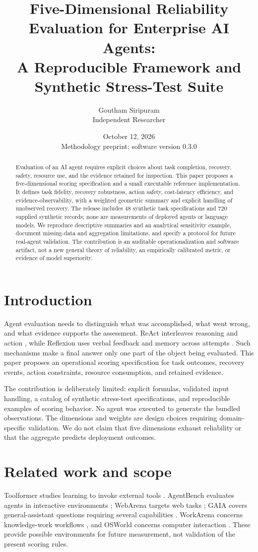 \documentclass[11pt]{article}
\title{Five-Dimensional Reliability Evaluation for Enterprise AI Agents:\\A Reproducible Framework and Synthetic Stress-Test Suite}
\author{Goutham Siripuram\\Independent Researcher}
\date{October 12, 2026\\\small Methodology preprint; software version 0.3.0}
\begin{document}
\maketitle
\begin{abstract}
Evaluation of an AI agent requires explicit choices about task completion, recovery, safety, resource use, and the evidence retained for inspection. This paper proposes a five-dimensional scoring specification and a small executable reference implementation. It defines task fidelity, recovery robustness, action safety, cost-latency efficiency, and evidence-observability, with a weighted geometric summary and explicit handling of unobserved recovery. The release includes 48 synthetic task specifications and 720 supplied synthetic records; none are measurements of deployed agents or language models. We reproduce descriptive summaries and an analytical sensitivity example, document missing-data and aggregation limitations, and specify a protocol for future real-agent validation. The contribution is an auditable operationalization and software artifact, not a new general theory of reliability, an empirically calibrated metric, or evidence of model superiority.
\end{abstract}

\section{Introduction}
Agent evaluation needs to distinguish what was accomplished, what went wrong, and what evidence supports the assessment. ReAct interleaves reasoning and action \cite{yao2023react}, while Reflexion uses verbal feedback and memory across attempts \cite{shinn2023reflexion}. Such mechanisms make a final answer only one part of the object being evaluated. This paper proposes an operational scoring specification for task outcomes, recovery events, action constraints, resource consumption, and retained evidence.

The contribution is deliberately limited: explicit formulas, validated input handling, a catalog of synthetic stress-test specifications, and reproducible examples of scoring behavior. No agent was executed to generate the bundled observations. The dimensions and weights are design choices requiring domain-specific validation. We do not claim that five dimensions exhaust reliability or that the aggregate predicts deployment outcomes.

\section{Related work and scope}
Toolformer studies learning to invoke external tools \cite{schick2023toolformer}. AgentBench evaluates agents in interactive environments \cite{liu2024agentbench}; WebArena targets web tasks \cite{zhou2024webarena}; GAIA covers general-assistant questions requiring several capabilities \cite{mialon2024gaia}. WorkArena concerns knowledge-work workflows \cite{drouin2024workarena}, and OSWorld concerns computer interaction \cite{xie2024osworld}. These provide possible environments for future measurement, not validation of the present scoring rules.
\end{document}
